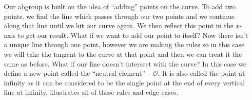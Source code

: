 Our \gls{abgroup} is built on the idea of \enquote{adding} points on the curve.
To add two points, we find the line which passes through our two points and we continue along that line until we hit our curve again.
We then reflect this point in the $x$-axis to get our result.
What if we want to add our point to itself? Now there isn't a unique line through one point, however we are making the rules so in this case we will take the tangent to the curve at that point and then we can treat it the same as before.
What if our line doesn't intersect with the curve? In this case we define a new point called the \enquote{neutral element} -- $\mathcal{O}$.
It is also called the point at infinity as it can be considered to be the single point at the end of every vertical line at infinity.
 illustrates all of these rules and edge cases.

